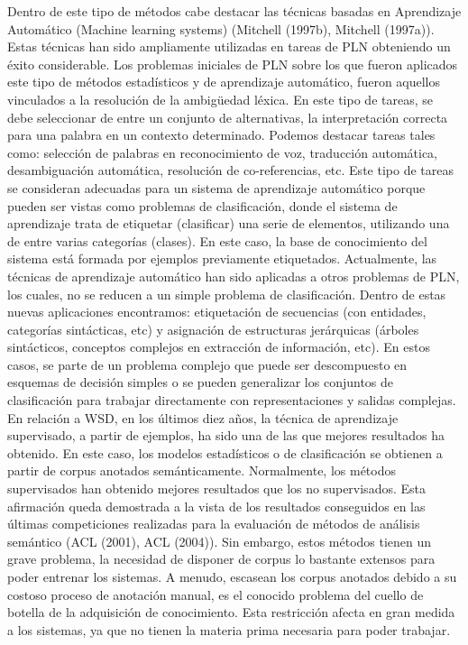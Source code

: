 Dentro de este tipo de métodos cabe destacar las técnicas basadas en Aprendizaje Automático (Machine learning systems) (Mitchell (1997b), Mitchell (1997a)). Estas técnicas han sido ampliamente utilizadas en tareas de PLN obteniendo un éxito considerable. Los problemas iniciales de PLN sobre los que fueron aplicados este tipo de métodos estadísticos y de aprendizaje automático, fueron aquellos vinculados a la resolución de la ambigüedad léxica. En este tipo de tareas, se debe seleccionar de entre un conjunto de alternativas, la interpretación correcta para una palabra en un contexto determinado. Podemos destacar tareas tales como: selección de palabras en reconocimiento de voz, traducción automática, desambiguación automática, resolución de co-referencias, etc. Este tipo de tareas se consideran adecuadas para un sistema de aprendizaje automático porque pueden ser vistas como problemas de clasificación, donde el sistema de aprendizaje trata de etiquetar (clasificar) una serie de elementos, utilizando una de entre varias categorías (clases). En este caso, la base de conocimiento del sistema está formada por ejemplos previamente etiquetados. Actualmente, las técnicas de aprendizaje automático han sido aplicadas a otros problemas de PLN, los cuales, no se reducen a un simple problema de clasificación. Dentro de estas nuevas aplicaciones encontramos: etiquetación de secuencias (con entidades, categorías sintácticas, etc) y asignación de estructuras jerárquicas (árboles sintácticos, conceptos complejos en extracción de información, etc). En estos casos, se parte de un problema complejo que puede ser descompuesto en esquemas de decisión simples o se pueden generalizar los conjuntos de clasificación para trabajar directamente con representaciones y salidas complejas. En relación a WSD, en los últimos diez años, la técnica de aprendizaje supervisado, a partir de ejemplos, ha sido una de las que mejores resultados ha obtenido. En este caso, los modelos estadísticos o de clasificación se obtienen a partir de corpus anotados semánticamente. Normalmente, los métodos supervisados han obtenido mejores resultados que los no supervisados. Esta afirmación queda demostrada a la vista de los resultados conseguidos en las últimas competiciones realizadas para la evaluación de métodos de análisis semántico (ACL (2001), ACL (2004)). Sin embargo, estos métodos tienen un grave problema, la necesidad de disponer de corpus lo bastante extensos para poder entrenar los sistemas. A menudo, escasean los corpus anotados debido a su costoso proceso de anotación manual, es el conocido problema del cuello de botella de la adquisición de conocimiento. Esta restricción afecta en gran medida a los sistemas, ya que no tienen la materia prima necesaria para poder trabajar.

